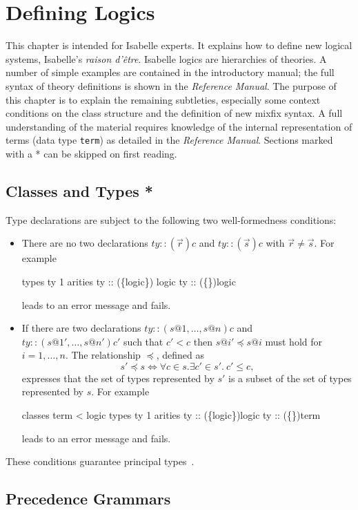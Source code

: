\chapter{Defining Logics} \label{Defining-Logics}
This chapter is intended for Isabelle experts.  It explains how to define new
logical systems, Isabelle's {\it raison d'\^etre}.  Isabelle logics are
hierarchies of theories.  A number of simple examples are contained in the
introductory manual; the full syntax of theory definitions is shown in the
{\em Reference Manual}.  The purpose of this chapter is to explain the
remaining subtleties, especially some context conditions on the class
structure and the definition of new mixfix syntax.  A full understanding of
the material requires knowledge of the internal representation of terms (data
type {\tt term}) as detailed in the {\em Reference Manual}.  Sections marked
with a * can be skipped on first reading.


\section{Classes and Types *}

Type declarations are subject to the following two well-formedness
conditions:
\begin{itemize}
\item There are no two declarations $ty :: (\vec{r})c$ and $ty :: (\vec{s})c$
  with $\vec{r} \neq \vec{s}$.  For example
\begin{ttbox}
types ty 1
arities ty :: (\{logic\}) logic
        ty :: (\{\})logic
\end{ttbox}
leads to an error message and fails.
\item If there are two declarations $ty :: (s@1,\dots,s@n)c$ and $ty ::
  (s@1',\dots,s@n')c'$ such that $c' < c$ then $s@i' \preceq s@i$ must hold
  for $i=1,\dots,n$.  The relationship $\preceq$, defined as
\[ s' \preceq s \iff \forall c\in s. \exists c'\in s'.~ c'\le c, \]
expresses that the set of types represented by $s'$ is a subset of the set of
types represented by $s$.  For example
\begin{ttbox}
classes term < logic
types ty 1
arities ty :: (\{logic\})logic
        ty :: (\{\})term
\end{ttbox}
leads to an error message and fails.
\end{itemize}
These conditions guarantee principal types~\cite{nipkow-prehofer}.

\section{Precedence Grammars}
\label{PrecedenceGrammars}

